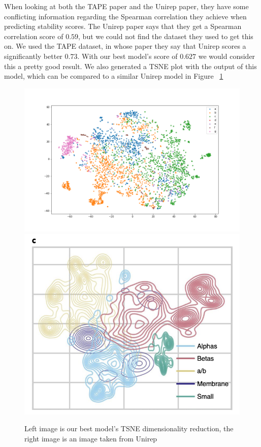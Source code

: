 When looking at both the TAPE paper\cite{tape} and the Unirep paper\cite{unirep}, they have some conflicting information regarding the Spearman correlation they achieve when predicting stability scores. The Unirep paper says that they get a Spearman correlation score of $0.59$, but we could not find the dataset they used to get this on. We used the TAPE dataset, in whose paper they say that Unirep scores a significantly better $0.73$. With our best model's score of $0.627$ we would consider this a pretty good result. We also generated a TSNE plot with the output of this model, which can be compared to a similar Unirep model in Figure ~\ref{fig:unirep_comp}

\begin{figure}[!ht]
  \centering
  \includegraphics[width=0.49\linewidth]{latex/imgs/tsne_1_layer_with_schedule_1024_minloss.png}
  \includegraphics[width=0.49\linewidth]{latex/imgs/unirep_tsne.png}
  \caption{Left image is our best model's TSNE dimensionality reduction, the right image is an image taken from Unirep\cite{unirep}}
  \label{fig:unirep_comp}
\end{figure}